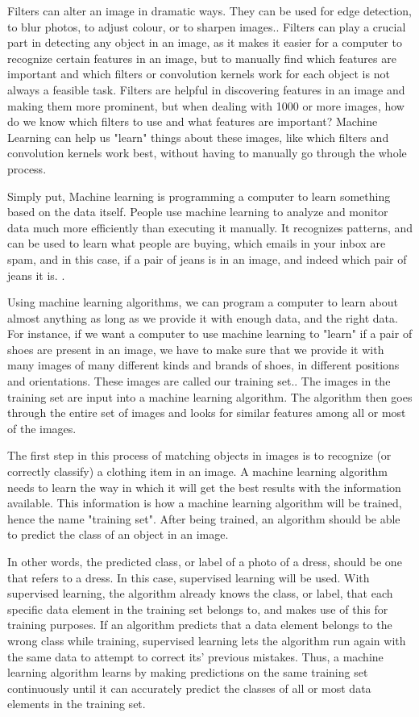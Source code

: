 \documentclass[12pt]{article} %
\begin{document}
	Filters can alter an image in dramatic ways. They can be used for edge detection, to blur photos, to adjust colour, or to sharpen images.\cite{szeliski2010computer}. Filters can play a crucial part in detecting any object in an image, as it makes it easier for a computer to recognize certain features in an image, but to manually find which features are important and which filters or convolution kernels work for each object is not always a feasible task. Filters are helpful in discovering features in an image and making them more prominent, but when dealing with 1000 or more images, how do we know which filters to use and what features are important? Machine Learning can help us "learn" things about these images, like which filters and convolution kernels work best, without having to manually go through the whole process. 

Simply put, Machine learning is programming a computer to learn something based on the data itself. People use machine learning to analyze and monitor data much more efficiently than executing it manually. It recognizes patterns, and can be used to learn what people are buying, which emails in your inbox are spam, and in this case, if a pair of jeans is in an image, and indeed which pair of jeans it is. \cite{aurelienMachineLearning}. 

Using machine learning algorithms, we can program a computer to learn about almost anything as long as we provide it with enough data, and the right data. For instance, if we want a computer to use machine learning to "learn" if a pair of shoes are present in an image, we have to make sure that we provide it with many images of many different kinds and brands of shoes, in different positions and orientations. These images are called our training set.\cite{aurelienMachineLearning}. The images in the training set are input into a machine learning algorithm. The algorithm then goes through the entire set of images and looks for similar features among all or most of the images. 
	
	The first step in this process of matching objects in images is to recognize (or correctly classify) a clothing item in an image. A machine learning algorithm needs to learn the way in which it will get the best results with the information available. This information is how a machine learning algorithm will be trained, hence the name "training set". After being trained, an algorithm should be able to predict the class of an object in an image. 

In other words, the predicted class, or label of a photo of a dress, should be one that refers to a dress. In this case, supervised learning will be used. With supervised learning, the algorithm already knows the class, or label, that each specific data element in the training set belongs to, and makes use of this for training purposes. If an algorithm predicts that a data element belongs to the wrong class while training, supervised learning lets the algorithm run again with the same data to attempt to correct its' previous mistakes\cite{aurelienMachineLearning}. Thus, a machine learning algorithm learns by making predictions on the same training set continuously until it can accurately predict the classes of all or most data elements in the training set. 
	
\end{document}
